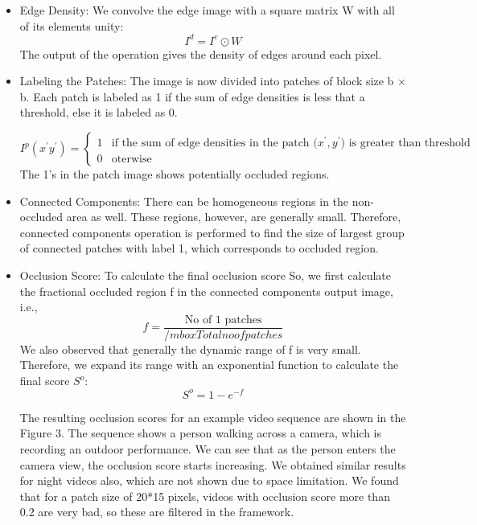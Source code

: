 \documentclass{sig-alternate}
\begin{document}
{{{\begin{itemize}
\begin{displaymath}
\begin{array}{ll}
            1 & \quad \mbox{if edge is detected at pixel I(x, y)} \\
            0 & \quad x > 0
        \end{array}
    \right.
\end{displaymath}
   \item Edge Density: We convolve the edge image with a square
matrix W with all of its elements unity:
 $$
   I^d = I^e \odot W
 $$
 The output of the operation gives the density of edges around
each pixel.
\item
Labeling the Patches: The image is now divided into patches
of block size b × b. Each patch is labeled as 1 if the sum of
edge densities is less that a threshold, else it is labeled as 0.

$$
  I^p(x^{'}y^{'})= \left\{
        \begin{array}{ll}
            1 & \mbox{if the sum of edge densities in the
patch (}x^{'},y^{'}\mbox{) is greater than threshold} \\
            0 & \mbox{oterwise}
        \end{array}
    \right.
$$
The 1’s in the patch image shows potentially occluded regions.
   \item Connected Components: There can be homogeneous regions
in the non-occluded area as well. These regions, however, are
generally small. Therefore, connected components operation
is performed to find the size of largest group of connected
patches with label 1, which corresponds to occluded region.
   \item Occlusion Score: To calculate the final occlusion score So,
we first calculate the fractional occluded region f in the connected
components output image, i.e.,
   $$
     f=\frac{\mbox{No of 1 patches}}{/mbox{Total no of patches}}
   $$
   We also observed that generally the dynamic range of f is very
small. Therefore, we expand its range with an exponential function
to calculate the final score $S^o$:
 $$
   S^o = 1-e^{-f}
 $$
 
 The resulting occlusion scores for an example video sequence
are shown in the Figure 3. The sequence shows a person walking
across a camera, which is recording an outdoor performance. We
can see that as the person enters the camera view, the occlusion
score starts increasing. We obtained similar results for night videos
also, which are not shown due to space limitation. We found that
for a patch size of 20*15 pixels, videos with occlusion score more
than 0.2 are very bad, so these are filtered in the framework.
\end{itemize}

}}}
\end{document}
